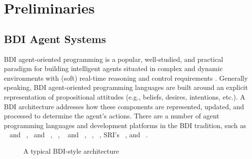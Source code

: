 \section{Preliminaries}\label{sec:preliminaries}

\newcommand{\success}{\mbox{\emph{succ}}}
\newcommand{\failure}{\mbox{\emph{fail}}}

\newcommand{\procedurefont}[1]{\mathsf{#1}}
\newcommand{\StableGoal}{\procedurefont{StableGoal}}
\newcommand{\RecordTrace}{\procedurefont{RecordFailedTrace}}
\newcommand{\RecordWorldDT}{\procedurefont{RecordWorldDT}}



\subsection{BDI Agent Systems}\label{sec:bdi_programming}

BDI agent-oriented programming is a popular, well-studied, and practical paradigm
for building intelligent agents situated in complex and dynamic environments with
(soft) real-time reasoning and control requirements
\cite{Georgeff89-PRS,Benfield:AAMAS06}.
Generally speaking, BDI agent-oriented programming languages are built around an
explicit representation of propositional attitudes (e.g., beliefs, desires,
intentions, etc.). A BDI architecture addresses how these components are
represented, updated, and processed to determine the agent's actions.
There are a number of agent programming languages and development platforms in
the BDI tradition, such as \PRS~\cite{IngrandGR:IEEE92-PRS} and
\dMARS~\cite{Inverno:JAAMAS04-dMARS}, \AgentSpeak\ and
\JASON~\cite{Rao:LNCS96-AgentSpeak,Bordini:07-JASONBOOK},
\JADEX~\cite{PokahrBL:EXP03-JADEX},
\TAPL~\cite{Hindriks:JAAMAS99-3APL,DastaniRM:05} and
\DAPL~\cite{Dastani:JAAMAS08-2APL}, \GOAL~\cite{BoerHHM:JAPL07-GOAL},
\JACK~\cite{BusettaRHL:AL99-JACK}, SRI's \SPARK~\cite{MorelyM:AAMAS04-SPARK}, and
\JAM~\cite{Huber:AGENTS99-JAM}.



\begin{figure}[t]
\begin{center}
\resizebox{.7\textwidth}{!}{}
\end{center}
\caption{A typical BDI-style architecture}
\label{fig:bdiarch}
\end{figure}

